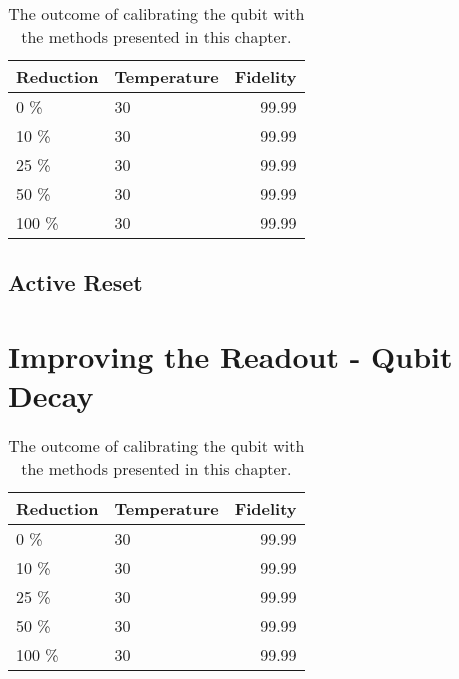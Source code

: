 \begin{table}[h]
\centering
\caption{The outcome of calibrating the qubit with the methods presented in this chapter.}
\begin{tabular}{ll|r}
\hline
\textbf{Reduction}        & Temperature                  & Fidelity\\ \hline
0   \%                      &  30                        &  99.99\\
10  \%                     &  30                         &  99.99\\
25  \%                     &  30                         &  99.99\\
50  \%                     &  30                         &  99.99\\
100 \%                     &  30                         &  99.99\\
\end{tabular}
\label{tab:readout_infidelity_contribution_estimation}
\end{table}


\subsection{Active Reset}

\section{Improving the Readout - Qubit Decay}


\begin{table}[h]
\centering
\caption{The outcome of calibrating the qubit with the methods presented in this chapter.}
\begin{tabular}{ll|r}
\hline
\textbf{Reduction}        & Temperature                  & Fidelity\\ \hline
0   \%                      &  30                        &  99.99\\
10  \%                     &  30                         &  99.99\\
25  \%                     &  30                         &  99.99\\
50  \%                     &  30                         &  99.99\\
100 \%                     &  30                         &  99.99\\
\end{tabular}
\label{tab:readout_infidelity_contribution_estimation}
\end{table}



